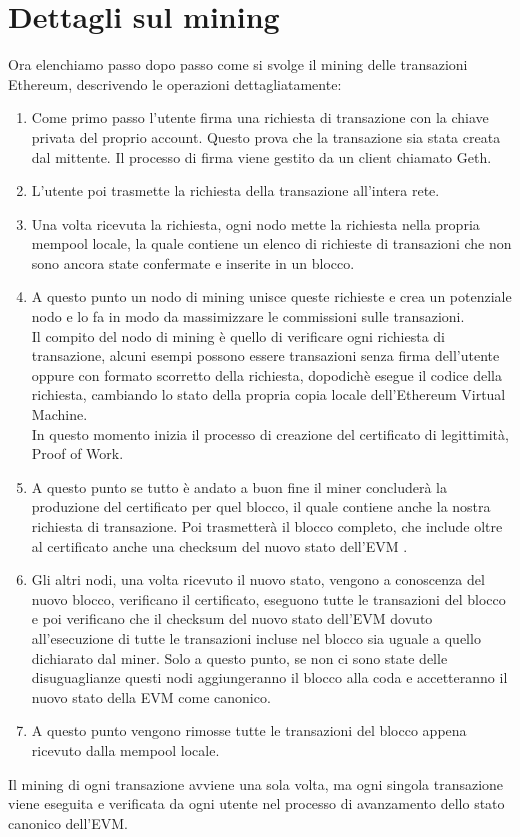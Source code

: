\documentclass[a4paper,11pt]{report}
\begin{document}
\section{Dettagli sul mining}
Ora elenchiamo passo dopo passo come si svolge il mining delle transazioni Ethereum, descrivendo le operazioni dettagliatamente:
\begin{enumerate} %
\item Come primo passo l'utente firma una richiesta di transazione con la chiave privata del proprio account. Questo prova che la transazione sia stata creata dal mittente. Il processo di firma viene gestito da un client chiamato Geth. 
\item L'utente poi trasmette la richiesta della transazione all'intera rete.
\item Una volta ricevuta la richiesta, ogni nodo mette la richiesta nella propria mempool locale, la quale contiene un elenco di richieste di transazioni che non sono ancora state confermate e inserite in un blocco.
\item A questo punto un nodo di mining unisce queste richieste e crea un potenziale nodo e lo fa in modo da massimizzare le commissioni sulle transazioni.\\ Il compito del nodo di mining è quello di verificare ogni richiesta di transazione, alcuni esempi possono essere transazioni senza firma dell'utente oppure con formato scorretto della richiesta, dopodichè esegue il codice della richiesta, cambiando lo stato della propria copia locale dell'Ethereum Virtual Machine.\\
In questo momento inizia il processo di creazione del certificato di legittimità, Proof of Work.
\item A questo punto se tutto è andato a buon fine il miner concluderà la produzione del certificato per quel blocco, il quale contiene anche la nostra richiesta di transazione. Poi trasmetterà il blocco completo, che include oltre al certificato anche una checksum del nuovo stato dell'EVM .
\item Gli altri nodi, una volta ricevuto il nuovo stato, vengono a conoscenza del nuovo blocco, verificano il certificato, eseguono tutte le transazioni del blocco e poi verificano che il checksum del nuovo stato dell'EVM dovuto all'esecuzione di tutte le transazioni incluse nel blocco sia uguale a quello dichiarato dal miner. Solo a questo punto, se non ci sono state delle disuguaglianze questi nodi aggiungeranno il blocco alla coda e accetteranno il nuovo stato della EVM come canonico.
\item A questo punto vengono rimosse tutte le transazioni del blocco appena ricevuto dalla mempool locale.
\end{enumerate}
Il mining di ogni transazione avviene una sola volta, ma ogni singola transazione viene eseguita e verificata da ogni utente nel processo di avanzamento dello stato canonico dell'EVM.
\end{document}
